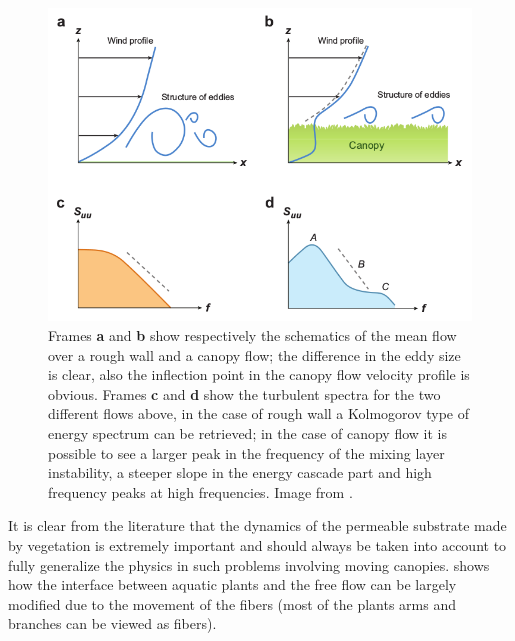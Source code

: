 \begin{figure}[h]
	\centering
	\includegraphics[width=0.7\linewidth]{chapter_1/spectra}
	\caption{Frames \textbf{a} and \textbf{b} show respectively the schematics of the mean flow over a rough wall and a canopy flow; the difference in the eddy size is clear, also the inflection point in the canopy flow velocity profile is obvious.
		Frames \textbf{c} and \textbf{d} show the turbulent spectra for the two different flows above, in the case of rough wall a Kolmogorov type of energy spectrum can be retrieved; in the case of canopy flow it is possible to see  a larger peak in the frequency of the mixing layer instability, a steeper slope in the energy cascade part and high frequency peaks at high frequencies. Image from \citet{de2008effects}.}
		\label{fig:spectra}
	\end{figure}

It is clear from the literature that the dynamics of the permeable substrate made by vegetation is extremely important and should always be taken into account to fully generalize the physics in such problems involving moving canopies. \citet{nepf2012flow} shows how the interface between aquatic plants and the free flow can be largely modified due to the movement of the fibers (most of the plants arms and branches can be viewed as fibers).

